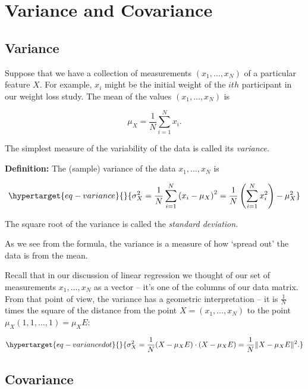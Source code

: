 \documentclass[
  11pt,
  letterpaper,
]{scrbook}
\theoremstyle{plain}
\theoremstyle{remark}
\begin{document}
\hypertarget{variance-and-covariance}{%
\section{Variance and Covariance}\label{variance-and-covariance}}

\hypertarget{variance}{%
\subsection{Variance}\label{variance}}

Suppose that we have a collection of measurements \((x_1,\ldots, x_N)\)
of a particular feature \(X\). For example, \(x_i\) might be the initial
weight of the \(ith\) participant in our weight loss study. The mean of
the values \((x_1,\ldots, x_N)\) is

\[
\mu_{X} = \frac{1}{N}\sum_{i=1}^{N} x_{i}.
\]

The simplest measure of the variability of the data is called its
\emph{variance.}

\textbf{Definition:} The (sample) variance of the data
\(x_1,\ldots, x_N\) is

\begin{equation}\protect\hypertarget{eq-variance}{}{
\sigma_{X}^2 = \frac{1}{N}\sum_{i=1}^{N} \left(x_{i}-\mu_{X}\right)^2 = \frac{1}{N}\left(\sum_{i=1}^{N} x_{i}^2\right)- \mu_{X}^2
}\label{eq-variance}\end{equation}

The square root of the variance is called the \emph{standard deviation.}

As we see from the formula, the variance is a measure of how `spread
out' the data is from the mean.

Recall that in our discussion of linear regression we thought of our set
of measurements \(x_1,\ldots, x_N\) as a vector -- it's one of the
columns of our data matrix. From that point of view, the variance has a
geometric interpretation -- it is \(\frac{1}{N}\) times the square of
the distance from the point \(X=(x_1,\ldots, x_N)\) to the point
\(\mu_{X}(1,1,\ldots,1)=\mu_{X}E\):

\begin{equation}\protect\hypertarget{eq-variancedot}{}{
\sigma_{X}^2 = \frac{1}{N}(X-\mu_{X}E)\cdot(X-\mu_{X}E)  = \frac{1}{N}\|X-\mu_{X}E\|^2.
}\label{eq-variancedot}\end{equation}

\hypertarget{covariance}{%
\subsection{Covariance}\label{covariance}}
\end{document}
